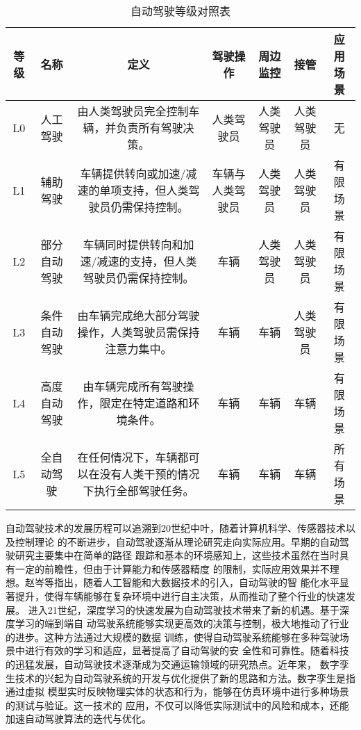 	
\begin{table}[htbp]
	\centering
	\caption{自动驾驶等级对照表}
	\label{tab:driving-levels}
	\begin{tabular}{ccccccc}
		\toprule
		\textbf{等级} & \textbf{名称} & \textbf{定义} & \textbf{驾驶操作} & \textbf{周边监控} & \textbf{接管} & \textbf{应用场景} \\
		\midrule
		L0   & 人工驾驶     & 由人类驾驶员完全控制车辆，并负责所有驾驶决策。 & 人类驾驶员 & 人类驾驶员 & 人类驾驶员 & 无 \\
		L1   & 辅助驾驶     & 车辆提供转向或加速/减速的单项支持，但人类驾驶员仍需保持控制。 & 车辆与人类驾驶员 & 人类驾驶员 & 人类驾驶员 & 有限场景 \\
		L2   & 部分自动驾驶 & 车辆同时提供转向和加速/减速的支持，但人类驾驶员仍需保持控制。 & 车辆 & 人类驾驶员 & 人类驾驶员 & 有限场景 \\
		L3   & 条件自动驾驶 & 由车辆完成绝大部分驾驶操作，人类驾驶员需保持注意力集中。 & 车辆 & 车辆 & 人类驾驶员 & 有限场景 \\
		L4   & 高度自动驾驶 & 由车辆完成所有驾驶操作，限定在特定道路和环境条件。 & 车辆 & 车辆 & 车辆 & 有限场景 \\
		L5   & 全自动驾驶   & 在任何情况下，车辆都可以在没有人类干预的情况下执行全部驾驶任务。 & 车辆 & 车辆 & 车辆 & 所有场景 \\
		\bottomrule
	\end{tabular}
\end{table}




自动驾驶技术的发展历程可以追溯到20世纪中叶，随着计算机科学、传感器技术以及控制理论
的不断进步，自动驾驶逐渐从理论研究走向实际应用。早期的自动驾驶研究主要集中在简单的路径
跟踪和基本的环境感知上，这些技术虽然在当时具有一定的前瞻性，但由于计算能力和传感器精度
的限制，实际应用效果并不理想。赵岑等指出，随着人工智能和大数据技术的引入，自动驾驶的智
能化水平显著提升，使得车辆能够在复杂环境中进行自主决策，从而推动了整个行业的快速发展\cite{小龙刘2024人工智能和大数据技术在自动驾驶中的应用}。
进入21世纪，深度学习的快速发展为自动驾驶技术带来了新的机遇。基于深度学习的端到端自
动驾驶系统能够实现更高效的决策与控制，极大地推动了行业的进步。这种方法通过大规模的数据
训练，使得自动驾驶系统能够在多种驾驶场景中进行有效的学习和适应，显著提高了自动驾驶的安
全性和可靠性。随着科技的迅猛发展，自动驾驶技术逐渐成为交通运输领域的研究热点\cite{丘德龙2018浅谈人工智能在汽车领域中的应用}。近年来，
数字孪生技术的兴起为自动驾驶系统的开发与优化提供了新的思路和方法。数字孪生是指通过虚拟
模型实时反映物理实体的状态和行为，能够在仿真环境中进行多种场景的测试与验证\cite{罗健炜2023基于数字孪生的自动驾驶仿真测试研究}。这一技术的
应用，不仅可以降低实际测试中的风险和成本，还能加速自动驾驶算法的迭代与优化。

